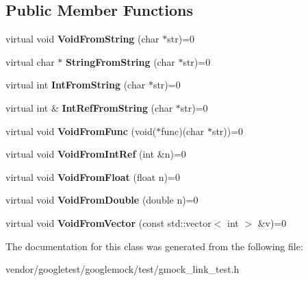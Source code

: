 \subsection*{Public Member Functions}
\begin{DoxyCompactItemize}
\item 
\mbox{\label{class_interface_a65d6ae604e7e9a513aec72c9c94e0b97}} 
virtual void {\bfseries Void\+From\+String} (char $\ast$str)=0
\item 
\mbox{\label{class_interface_a756b1d22c12aa3f14a5083f90043fbf0}} 
virtual char $\ast$ {\bfseries String\+From\+String} (char $\ast$str)=0
\item 
\mbox{\label{class_interface_ab34c8a5fd2236a6b009f86a4e5851b61}} 
virtual int {\bfseries Int\+From\+String} (char $\ast$str)=0
\item 
\mbox{\label{class_interface_ab93276de67e60c44fd775d4c139aa8e1}} 
virtual int \& {\bfseries Int\+Ref\+From\+String} (char $\ast$str)=0
\item 
\mbox{\label{class_interface_a7dab3c82b857a9a5f52b3ce6f7df547f}} 
virtual void {\bfseries Void\+From\+Func} (void($\ast$func)(char $\ast$str))=0
\item 
\mbox{\label{class_interface_aa43fb56650a57b6b3e7743e54e50cb86}} 
virtual void {\bfseries Void\+From\+Int\+Ref} (int \&n)=0
\item 
\mbox{\label{class_interface_ae2b3e9411c893a45642d3af632752c66}} 
virtual void {\bfseries Void\+From\+Float} (float n)=0
\item 
\mbox{\label{class_interface_aa56524017aabdbe46510648c711ab8a8}} 
virtual void {\bfseries Void\+From\+Double} (double n)=0
\item 
\mbox{\label{class_interface_ae84fe7e53f881db2f823ad35d004927a}} 
virtual void {\bfseries Void\+From\+Vector} (const std\+::vector$<$ int $>$ \&v)=0
\end{DoxyCompactItemize}


The documentation for this class was generated from the following file\+:\begin{DoxyCompactItemize}
\item 
vendor/googletest/googlemock/test/gmock\+\_\+link\+\_\+test.\+h\end{DoxyCompactItemize}
